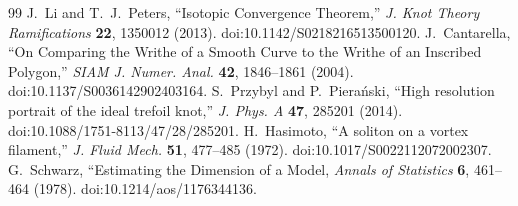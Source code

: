 \begin{thebibliography}{99}
 J.~Li and T.~J.~Peters, ``Isotopic Convergence Theorem,'' \emph{J. Knot Theory Ramifications} \textbf{22}, 1350012 (2013). doi:10.1142/S0218216513500120.
 J.~Cantarella, ``On Comparing the Writhe of a Smooth Curve to the Writhe of an Inscribed Polygon,'' \emph{SIAM J. Numer. Anal.} \textbf{42}, 1846--1861 (2004). doi:10.1137/S0036142902403164.
 S.~Przybyl and P.~Piera\'nski, ``High resolution portrait of the ideal trefoil knot,'' \emph{J. Phys. A} \textbf{47}, 285201 (2014). doi:10.1088/1751-8113/47/28/285201.
 H.~Hasimoto, ``A soliton on a vortex filament,'' \emph{J. Fluid Mech.} \textbf{51}, 477--485 (1972). doi:10.1017/S0022112072002307.
 G.~Schwarz, ``Estimating the Dimension of a Model, \emph{Annals of Statistics} \textbf{6}, 461--464 (1978). doi:10.1214/aos/1176344136.
\end{thebibliography}
